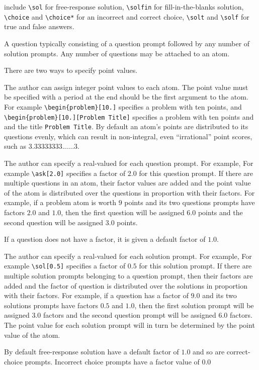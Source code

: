   include 
%
\lstinline`\sol` for free-response solution, 
%
\lstinline`\solfin` for fill-in-the-blanks solution, 
%
\lstinline`\choice` and \lstinline`\choice*` for an incorrect and correct choice, 
%
\lstinline`\solt` and \lstinline`\solf`   for true and false answers.

A question typically consisting of a question prompt followed by any
number of solution prompts.  
%
Any number of questions may be attached  to an atom.

There are two ways to specify point values.
%

\begin{gram}
The author can assign integer point values to each atom. The point value must be specified with a period at the end should be the first argument to the atom.
%
For example \lstinline`\begin{problem}[10.]` specifies a  problem with ten points, and
%
\lstinline`\begin{problem}[10.][Problem Title]` specifies a  problem with ten points and and the title
\lstinline`Problem Title`.
%
By default an atom's points are distributed to its questions evenly,
which can result in non-integral, even ``irrational'' point scores, such as $3.33333333...\ldots 3$. 
%
\end{gram}


\begin{gram}
The author can specify a real-valued  for each question prompt.  For
example, For example \lstinline`\ask[2.0]` specifies a factor of $2.0$
for this question prompt. If there are multiple questions in an atom,
their factor values are added and the point value of the atom is
distributed over the questions in proportion with their factors.  For
example, if a problem atom is worth $9$ points and its two questions
prompts have factors $2.0$ and $1.0$, then the first question will be
assigned $6.0$ points and the second question will be assigned $3.0$
points.

If a question does not have a factor, it is given a default factor of $1.0$. 
\end{gram}

\begin{gram}
The author can specify a real-valued  for each solution prompt.  For
example, For example \lstinline`\sol[0.5]` specifies a factor of $0.5$
for this solution prompt. If there are multiple solution prompts
belonging to a question prompt, then their factors are added and the
factor of question is distributed over the solutions in proportion
with their factors.  For example, if a question has a factor of $9.0$
and its two solutions prompts have factors $0.5$ and $1.0$, then
the first solution prompt will be assigned $3.0$ factors and the second question
prompt will be assigned $6.0$ factors.  The point value  for each solution prompt will in turn be determined by the point value of the atom.

By default free-response solution have a default factor of $1.0$ and
so are correct-choice prompts.  Incorrect choice prompts have a factor value of $0.0$
\end{gram}


